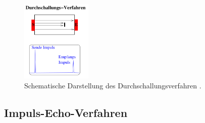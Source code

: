\begin{figure}[H]
    \centering
    \includegraphics[width=0.3\textwidth]{data/Durchschallungsverfahren.png}
    \caption{Schematische Darstellung des Durchschallungsverfahren \cite{AnleitungUS2}.}
    \label{fig:durchschallung}
\end{figure}

\subsection*{Impuls-Echo-Verfahren}
\label{subsec:ImpEcho}

